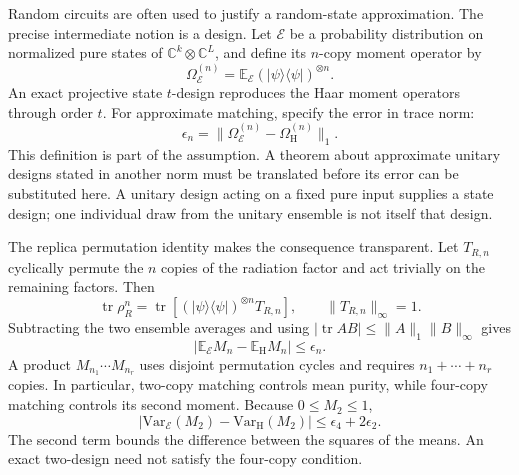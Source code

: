 \documentclass[11pt,letterpaper]{article}
\theoremstyle{plain}
\theoremstyle{definition}
\theoremstyle{remark}
\newcommand{\E}{\mathbb{E}}
\newcommand{\Var}{\text{Var}}
\DeclareMathOperator{\tr}{tr}
\begin{document}
Random circuits are often used to justify a random-state approximation.
The precise intermediate notion is a design. Let $\mathcal E$ be a
probability distribution on normalized pure states of
$\mathbb C^k\otimes\mathbb C^L$, and define its $n$-copy moment
operator by
\begin{equation}
 \Omega_{\mathcal E}^{(n)}
 =\E_{\mathcal E}(|\psi\rangle\langle\psi|)^{\otimes n}.
 \label{eq11:moment_operator}
\end{equation}
An exact projective state $t$-design reproduces the Haar moment
operators through order $t$. For approximate matching, specify the
error in trace norm:
\begin{equation}
 \epsilon_n=\|\Omega_{\mathcal E}^{(n)}
                  -\Omega_{\mathrm H}^{(n)}\|_1.
 \label{eq11:design_error}
\end{equation}
This definition is part of the assumption. A theorem about approximate
unitary designs stated in another norm must be translated before its
error can be substituted here. A unitary design acting on a fixed pure
input supplies a state design; one individual draw from the unitary
ensemble is not itself that design.

The replica permutation identity makes the consequence transparent.
Let $T_{R,n}$ cyclically permute the $n$ copies of the radiation factor
and act trivially on the remaining factors. Then
\begin{equation}
 \tr\rho_R^n=\tr\!\left[
 (|\psi\rangle\langle\psi|)^{\otimes n}T_{R,n}\right],
 \qquad \|T_{R,n}\|_\infty=1.
 \label{eq11:swap_identity}
\end{equation}
Subtracting the two ensemble averages and using
$|\tr AB|\leq\|A\|_1\|B\|_\infty$ gives
\begin{equation}
 \left|\E_{\mathcal E}M_n-\E_{\mathrm H}M_n\right|
 \leq\epsilon_n.
 \label{eq11:design_mp}
\end{equation}
A product $M_{n_1}\cdots M_{n_r}$ uses disjoint permutation cycles
and requires $n_1+\cdots+n_r$ copies. In particular, two-copy matching
controls mean purity, while four-copy matching controls its second
moment. Because $0\leq M_2\leq1$,
\begin{equation}
 \left|\Var_{\mathcal E}(M_2)-\Var_{\mathrm H}(M_2)\right|
 \leq\epsilon_4+2\epsilon_2.
 \label{eq11:design_variance}
\end{equation}
The second term bounds the difference between the squares of the means.
An exact two-design need not satisfy the four-copy condition.
\end{document}
